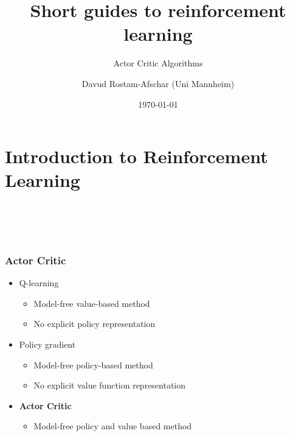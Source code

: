 \documentclass[11pt,table]{beamer}
\title[]{Short guides to reinforcement learning}
\subtitle[]{Actor Critic Algorithms}
\author[D. Rostam-Afschar]{\textcolor{gray1}{Davud Rostam-Afschar (Uni Mannheim)}}
\date[]{\today}
\begin{document}
\begin{frame}[plain]
  \titlepage
\end{frame}


\section{Introduction to Reinforcement Learning}
{
\begin{frame}
\centering
\Huge
\textcolor{white}{Learn acting via policy gradient---\\evaluate actions via TD\\... or the advantage}
\thispagestyle{empty}
\end{frame}
}




\begin{frame}
\frametitle{Actor Critic}

\begin{itemize}
    \item Q-learning
    \begin{itemize}
        \item Model-free value-based method
        \item No explicit policy representation\\[2ex]
    \end{itemize}
    
    \item Policy gradient
    \begin{itemize}
        \item Model-free policy-based method
        \item No explicit value function representation\\[2ex]
    \end{itemize}
    
    \item \textbf{Actor Critic}
    \begin{itemize}
        \item \textcolor{red1}{Model-free policy and value based method}
    \end{itemize}
\end{itemize}

\end{frame}
\end{document}
